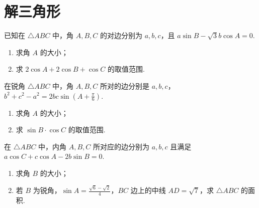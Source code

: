 \documentclass[a4paper , final]{ctexart}
\newenvironment{problem}[1]{%
  \item #1
  \par
  \vspace{8cm}
}{}
\begin{document}
\newpage
\section*{解三角形}
\begin{problems}
  \begin{problem}
  {
  已知在 $\triangle ABC$ 中，角 $A, B, C$ 的对边分别为 $a, b, c$，且 $a\sin B - \sqrt{3}b\cos A = 0$.
  \begin{enumerate}[label=(\arabic*)]
    \item 求角 $A$ 的大小；
    \item 求 $2\cos A + 2\cos B + \cos C$ 的取值范围.
  \end{enumerate}
  }
  \end{problem}

  \begin{problem}
  {
  在锐角 $\triangle ABC$ 中，角 $A, B, C$ 所对的边分别是 $a, b, c$，$b^2 + c^2 - a^2 = 2bc\sin\left(A + \frac{\pi}{6}\right)$.
  \begin{enumerate}[label=(\Roman*)]
    \item 求角 $A$ 的大小；
    \item 求 $\sin B \cdot \cos C$ 的取值范围.
  \end{enumerate}
  }
  \end{problem}

  \begin{problem}
  {
  在 $\triangle ABC$ 中，内角 $A,B,C$ 所对应的边分别为 $a,b,c$ 且满足 $a\cos C +c\cos A - 2b\sin B = 0$.
  \begin{enumerate}[label=(\arabic*)]
    \item 求角 $B$ 的大小；
    \item 若 $B$ 为锐角，$\sin A = \frac{\sqrt{6}-\sqrt{2}}{4}$，$BC$ 边上的中线 $AD = \sqrt{7}$，求 $\triangle ABC$ 的面积.
  \end{enumerate}
  }
  \end{problem}
\end{problems}
\end{document}
